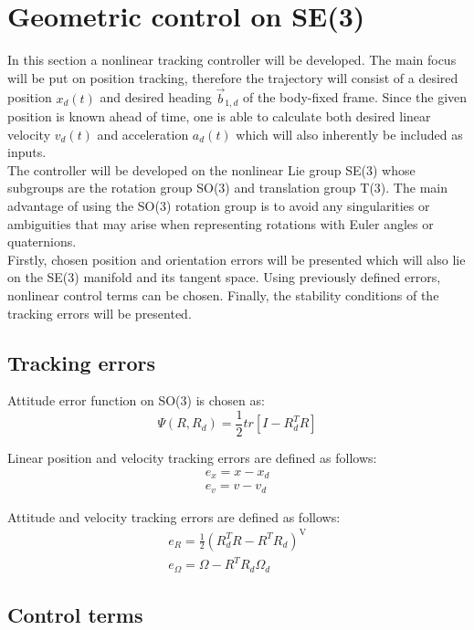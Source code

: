 \section{Geometric control on SE(3)}

In this section a nonlinear tracking controller will be developed. The main focus will be put on position tracking, therefore the trajectory will consist of a desired position $x_d(t)$ and desired heading $\vec{b}_{1,d}$ of the body-fixed frame. Since the given position is known ahead of time, one is able to calculate both desired linear velocity $v_d(t)$ and acceleration $a_d(t)$ which will also inherently be included as inputs. \\
The controller will be developed on the nonlinear Lie group SE(3) whose subgroups are the rotation group SO(3) and translation group T(3). The main advantage of using the SO(3) rotation group is to avoid any singularities or ambiguities that may arise when representing rotations with Euler angles or quaternions. \\
Firstly, chosen position and orientation errors will be presented which will also lie on the SE(3) manifold and its tangent space. Using previously defined errors, nonlinear control terms can be chosen. Finally, the stability conditions of the tracking errors will be presented.

\subsection{Tracking errors}

Attitude error function on SO(3) is chosen as:
\begin{equation}
	\Psi(R, R_d) = \frac{1}{2}tr[I - R_d^TR]
\end{equation}

Linear position and velocity tracking errors are defined as follows:
\begin{gather}
	e_x = x - x_d \\
	e_v = v - v_d \label{linear_error}
\end{gather}

Attitude and velocity tracking errors are defined as follows:
\begin{gather}
	e_R = \frac{1}{2}(R_d^TR - R^TR_d)^\text{V} \\
	e_\Omega = \Omega - R^TR_d\Omega_d \label{angular_error}
\end{gather}

\subsection{Control terms}

